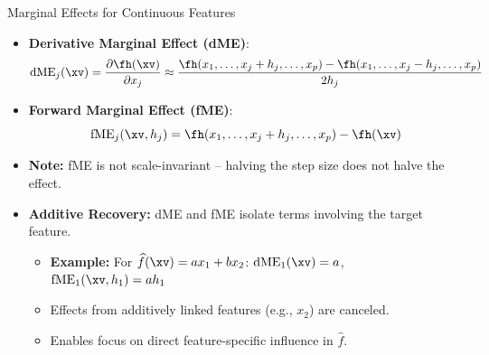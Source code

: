\documentclass[10pt,compress,t,notes=noshow, xcolor=table]{beamer}
\begin{document}
\begin{frame}{Marginal Effects for Continuous Features}
\begin{itemize}
\item \textbf{Derivative Marginal Effect (dME)}:
\[
\text{dME}_j(\xv) = \frac{\partial \fh(\xv)}{\partial x_j} \approx \frac{ \fh(x_1, \dots, x_j + h_j, \dots, x_p) -  \fh(x_1, \dots, x_j - h_j, \dots, x_p)}{2h_j}
\]
\item \textbf{Forward Marginal Effect (fME)}:
\[
\text{fME}_j(\xv, h_j) = \fh(x_1, \dots, x_j + h_j, \dots, x_p) - \fh(\xv)
\]

\end{itemize}
\begin{itemize}
\item \textbf{Note:} fME is not scale-invariant -- halving the step size does not halve the effect.


\item \textbf{Additive Recovery:} dME and fME isolate terms involving the target feature.
\begin{itemize}
\item \textbf{Example:} For $\widehat{f}(\xv) = a x_1 + b x_2$: 
$\text{dME}_1(\xv) = a$, \quad $\text{fME}_1(\xv, h_1) = a h_1$
\item Effects from additively linked features (e.g., $x_2$) are canceled.
\item Enables focus on direct feature-specific influence in $\widehat{f}$.
\end{itemize}

\end{itemize}

\end{frame}
\end{document}
